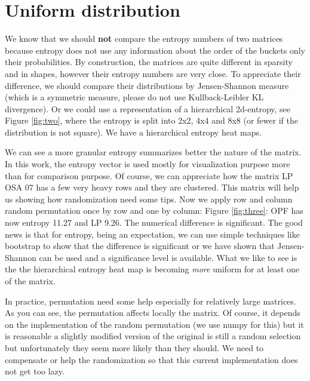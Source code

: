\documentclass[manuscript,screen]{acmart}
\begin{document}
\section{Uniform distribution}
\label{sec:uniform}
We know that we should {\bf not} compare the entropy numbers of two
matrices because entropy does not use any information about the order
of the buckets only their probabilities. By construction, the matrices
are quite different in sparsity and in shapes, however their entropy
numbers are very close. To appreciate their difference, we should
compare their distributions by Jensen-Shannon measure (which is a
symmetric measure, please do not use Kullback-Leibler KL
divergence). Or we could use a representation of a hierarchical
2d-entropy, see Figure \ref{fig:two}, where the entropy is split into
2x2, 4x4 and 8x8 (or fewer if the distribution is not square). We have
a hierarchical entropy heat maps.


We can see a more granular entropy summarizes better the nature of the
matrix. In this work, the entropy vector is used mostly for
visualization purpose more than for comparison purpose. Of course, we
can appreciate how the matrix LP OSA 07 has a few very heavy rows and
they are clustered. This matrix will help us showing how randomization
need some tips. Now we apply row and column random permutation once by
row and one by column: Figure \ref{fig:three}: OPF has now entropy
11.27 and LP 9.26. The numerical difference is significant. The good
news is that for entropy, being an expectation, we can use simple
techniques like bootstrap to show that the difference is significant
or we have shown that Jensen-Shannon can be used and a significance
level is available. What we like to see is the the hierarchical
entropy heat map is becoming {\em more} uniform for at least one of
the matrix.


In practice, permutation need some help especially for relatively
large matrices. As you can see, the permutation affects locally the
matrix. Of course, it depends on the implementation of the random
permutation (we use numpy for this) but it is reasonable a slightly
modified version of the original is still a random selection but
unfortunately they seem more likely than they should. We need to
compensate or help the randomization so that this current
implementation does not get too lazy.
\end{document}
